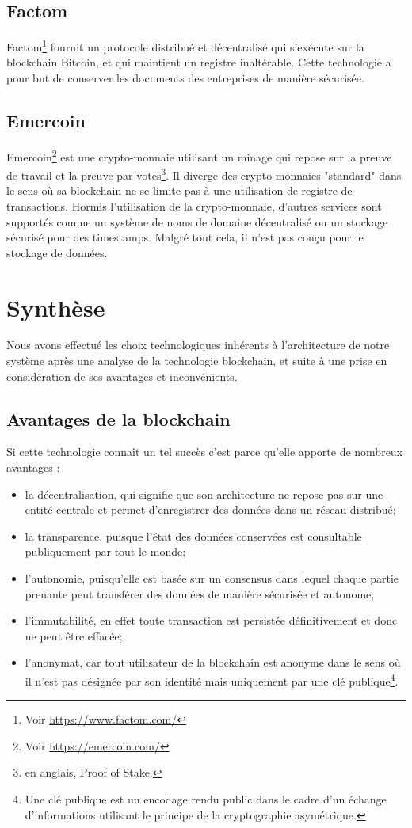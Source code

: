 \documentclass{tnreport}
\begin{document}
\subsection{Factom}

Factom\footnote{Voir \url{https://www.factom.com/}} fournit un protocole distribué et décentralisé qui s'exécute sur la blockchain Bitcoin, et qui maintient un registre inaltérable. Cette technologie a pour but de conserver les documents des entreprises de manière sécurisée.

\subsection{Emercoin}

Emercoin\footnote{Voir \url{https://emercoin.com/}} est une crypto-monnaie utilisant un minage qui repose sur la preuve de travail et la preuve par votes\footnote{en anglais, Proof of Stake.}. Il diverge des crypto-monnaies "standard" dans le sens où sa blockchain ne se limite pas à une utilisation de registre de transactions. Hormis l'utilisation de la crypto-monnaie, d'autres services sont supportés comme un système de noms de domaine décentralisé ou un stockage sécurisé pour des timestamps. Malgré tout cela, il n'est pas conçu pour le stockage de données.

\section{Synthèse}

Nous avons effectué les choix technologiques inhérents à l'architecture de notre système après une analyse de la technologie blockchain, et suite à une prise en considération de ses avantages et inconvénients.

\subsection{Avantages de la blockchain}

Si cette technologie connaît un tel succès c'est parce qu'elle apporte de nombreux avantages : 
\begin{itemize}
	\item la décentralisation, qui signifie que son architecture ne repose pas sur une entité centrale et permet d'enregistrer des données dans un réseau distribué; 
	\item la transparence, puisque l'état des données conservées est consultable publiquement par tout le monde; 
	\item l'autonomie, puisqu'elle est basée sur un consensus dans lequel chaque partie prenante peut transférer des données de manière sécurisée et autonome;
	\item l'immutabilité, en effet toute transaction est persistée définitivement et donc ne peut être effacée;
	\item l'anonymat, car tout utilisateur de la blockchain est anonyme dans le sens où il n'est pas désignée par son identité mais uniquement par une clé publique\footnote{Une clé publique est un encodage rendu public dans le cadre d'un échange d'informations utilisant le principe de la cryptographie asymétrique.}.
\end{itemize}
\end{document}

